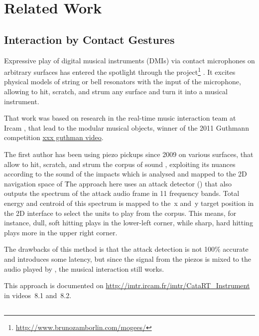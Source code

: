\section{Related Work}


\subsection{Interaction by Contact Gestures}


Expressive play of digital musical instruments (DMIs) via contact microphones on arbitrary surfaces has entered the spotlight through the  project\footnote{\url{http://www.brunozamborlin.com/mogees/}}  \cite{Zamborlin14a}.  It excites physical models of string or bell resonators with the input of the microphone, allowing to hit, scratch, and strum any surface and turn it into a musical instrument.  


That work was based on research in the real-time music interaction team at Ircam \cite{Rasamimanana11a,Bevilacqua11b,Zamborlin14a}, that lead to the  modular musical objects, winner of the 2011 Guthmann competition \url{xxx guthman video}.


The first author has been using piezo pickups since 2009 on various surfaces, that allow to hit, scratch, and strum the corpus of sound \cite{Schwarz-nime2012-sound-space}, exploiting
its nuances according to the sound of the impacts which is analysed and mapped to
the 2D navigation space of \catart\.


The approach here uses an attack detector () that also outputs the spectrum of the
attack audio frame in 11 frequency bands.  Total energy and centroid of this spectrum is mapped to
the~x and~y target position in the 2D interface to select the units to play from the corpus.
This means, for instance, dull, soft hitting plays in the lower-left corner, while sharp, hard hitting plays more in the upper right corner.


The drawbacks of this method is that the attack detection is not 100\% accurate and introduces some latency, but since the signal from the piezos is mixed to the
audio played by \catart, the musical interaction still works.


This approach is documented on \url{http://imtr.ircam.fr/imtr/CataRT_Instrument} in videos~8.1 and~8.2.


\subsection{\CBCS}


